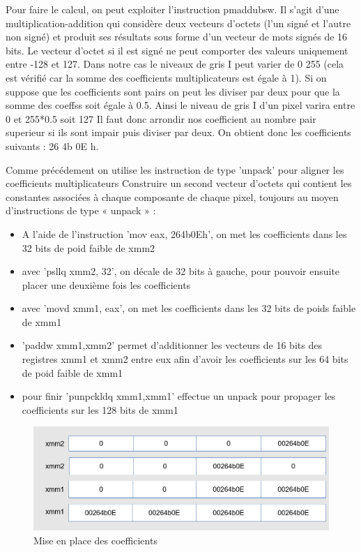 \documentclass[11pt]{report}
\begin{document}
Pour faire le calcul, on peut exploiter l’instruction pmaddubsw. Il s’agit d’une multiplication-addition
qui considère deux vecteurs d’octets (l’un signé et l’autre non signé) et
produit ses résultats sous forme d’un vecteur de mots signés de 16 bits. Le vecteur d'octet si il est signé ne peut comporter des valeurs uniquement entre -128 et 127.
Dans notre cas le niveaux de gris I peut varier de 0 255 (cela est vérifié car la somme des coefficients multiplicateurs est égale à 1).
Si on suppose que les coefficients sont pairs on peut les diviser par deux pour que la somme des coeffss soit égale à 0.5.
Ainsi le niveau de gris I d'un pixel varira entre 0 et 255*0.5 soit 127
Il faut donc arrondir nos coefficient au nombre pair superieur si ils sont impair puis diviser par deux.
On obtient donc les coefficients suivants : 26 4b 0E h.

Comme précédement on utilise les instruction de type 'unpack' pour aligner les coefficients multiplicateurs
Construire un second vecteur d’octets qui contient les constantes associées à chaque
composante de chaque pixel, toujours au moyen d’instructions de type « unpack » :
\begin{itemize}
\item A l'aide de l'instruction 'mov eax, 264b0Eh',  on met les coefficients dans les 32 bits de poid faible de xmm2
\item avec 'psllq xmm2, 32', on décale de 32 bits à gauche, pour pouvoir ensuite placer une deuxième fois les coefficients
\item avec 'movd xmm1, eax', on met les coefficients dans les 32 bits de poids faible de xmm1
\item 'paddw xmm1,xmm2' permet d'additionner les vecteurs de 16 bits des registres xmm1 et xmm2 entre eux afin d'avoir les coefficients sur les 64 bits de poid faible de xmm1
\item pour finir 'punpckldq xmm1,xmm1' effectue un unpack pour propager les coefficients sur les 128 bits de xmm1

\end{itemize}


\begin{figure}[h]
\includegraphics[width=13cm]{Capture1.PNG}
\caption{Mise en place des coefficients}
\end{figure}
\end{document}
